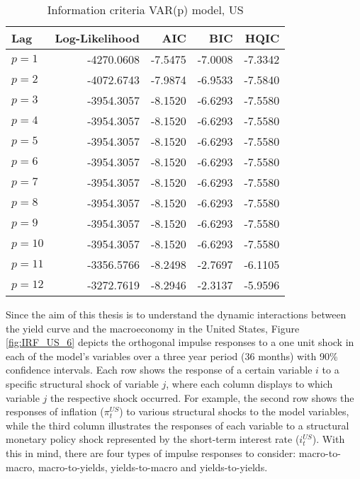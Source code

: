 \begin{table}[t]
    \centering
    \begin{tabular}{lrrrr}
    \toprule
           Lag &  Log-Likelihood &     AIC &     BIC &    HQIC \\
        \midrule
         $p=1$ &      -4270.0608 & -7.5475 & -7.0008 & -7.3342 \\
         $p=2$ &      -4072.6743 & -7.9874 & -6.9533 & -7.5840 \\
         $p=3$ &      -3954.3057 & -8.1520 & -6.6293 & -7.5580 \\
         $p=4$ &      -3954.3057 & -8.1520 & -6.6293 & -7.5580 \\
         $p=5$ &      -3954.3057 & -8.1520 & -6.6293 & -7.5580 \\
         $p=6$ &      -3954.3057 & -8.1520 & -6.6293 & -7.5580 \\
         $p=7$ &      -3954.3057 & -8.1520 & -6.6293 & -7.5580 \\
         $p=8$ &      -3954.3057 & -8.1520 & -6.6293 & -7.5580 \\
         $p=9$ &      -3954.3057 & -8.1520 & -6.6293 & -7.5580 \\
        $p=10$ &      -3954.3057 & -8.1520 & -6.6293 & -7.5580 \\
        $p=11$ &      -3356.5766 & -8.2498 & -2.7697 & -6.1105 \\
        $p=12$ &      -3272.7619 & -8.2946 & -2.3137 & -5.9596 \\
    \bottomrule
    \end{tabular}
    \caption{Information criteria VAR(p) model, US}
    \label{tab:ic_us}
\end{table}



Since the aim of this thesis is to understand the dynamic interactions
between the yield curve and the macroeconomy in the United States, Figure \ref{fig:IRF_US_6} depicts the orthogonal impulse responses to a one unit shock in each of the model's variables over a three year period (36 months) with 90\% confidence intervals. 
Each row shows the response of a certain variable $i$ to a specific structural shock of variable $j$, where each column displays to which variable $j$ the respective shock occurred. 
For example, the second row shows the responses of inflation ($\pi^{US}_{t}$) to various structural shocks to the model variables, while the third column illustrates the responses of each variable to a structural monetary policy shock represented by the short-term interest rate ($i^{US}_{t}$). 
With this in mind, there are four types of impulse responses to consider: macro-to-macro, macro-to-yields, yields-to-macro and yields-to-yields.  



